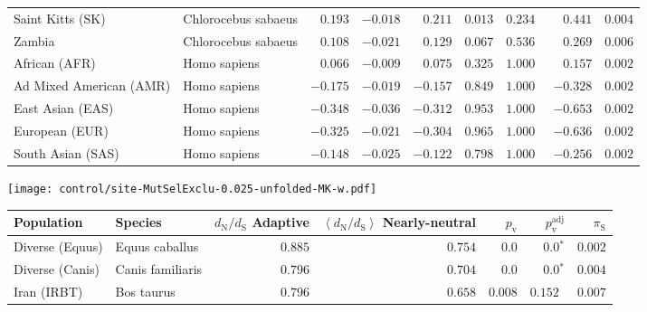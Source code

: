 \begin{center}
\begin{adjustbox}{width = 1\textwidth}
\begin{tabular}{|l|l|r|r|r|r|r|r|r|}
            Saint Kitts (SK)                  & Chlorocebus sabaeus        & $ 0.193$ & $-0.018$  & $ 0.211$ & $ 0.013$ & $ 0.234~~$        & $ 0.441$ & $ 0.004$ \\
            Zambia        & Chlorocebus sabaeus        & $ 0.108$ & $-0.021$  & $ 0.129$ & $ 0.067$ & $ 0.536~~$ & $ 0.269$ & $ 0.006$ \\
            African (AFR)               & Homo sapiens        & $ 0.066$ & $-0.009$  & $ 0.075$ & $ 0.325$ & $ 1.000~~$        & $ 0.157$ & $ 0.002$ \\
            Ad Mixed American (AMR)                 & Homo sapiens        & $-0.175$ & $-0.019$  & $-0.157$ & $ 0.849$ & $ 1.000~~$        & $-0.328$ & $ 0.002$ \\
            East Asian (EAS)              & Homo sapiens        & $-0.348$ & $-0.036$  & $-0.312$ & $ 0.953$ & $ 1.000~~$        & $-0.653$ & $ 0.002$ \\
            European (EUR)              & Homo sapiens        & $-0.325$ & $-0.021$  & $-0.304$ & $ 0.965$ & $ 1.000~~$        & $-0.636$ & $ 0.002$ \\
            South Asian (SAS)              & Homo sapiens        & $-0.148$ & $-0.025$  & $-0.122$ & $ 0.798$ & $ 1.000~~$        & $-0.256$ & $ 0.002$ \\
            \bottomrule
        \end{tabular}
    \end{adjustbox}
    \newpage
    \texttt{[image: control/site-MutSelExclu-0.025-unfolded-MK-w.pdf]}
    \begin{adjustbox}{width = 1\textwidth}
        \begin{tabular}{|l|l|r|r|r|r|r|}
            \toprule
            Population & Species & \specialcell{$d_{\mathrm{N}} / d_{\mathrm{S}}$ \\ Adaptive}                & \specialcell{$\left< d_{\mathrm{N}} / d_{\mathrm{S}} \right>$ \\ Nearly-neutral}                & $p_{\mathrm{v}}$    & $p_{\mathrm{v}}^{\mathrm{adj}}$ & $\pi_{\textrm{S}}$ \\
            \midrule
            Diverse (Equus)                    & Equus caballus          & $ 0.885$ & $ 0.754$ & $0.0$ & $\bm{0.0{^*}}$     & $ 0.002$ \\
            Diverse (Canis)                  & Canis familiaris          & $ 0.796$ & $ 0.704$ & $0.0$ & $\bm{0.0{^*}}$     & $ 0.004$ \\
            Iran (IRBT)               & Bos taurus        & $ 0.796$ & $ 0.658$ & $ 0.008$ & $ 0.152~~$     & $ 0.007$ \\

\end{tabular}
\end{adjustbox}
\end{center}
